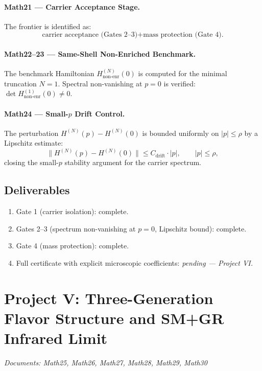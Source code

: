 \documentclass[reprint,aps,pre,onecolumn,superscriptaddress,amsmath,amssymb]{revtex4-2}
\begin{document}
\paragraph{Math21 --- Carrier Acceptance Stage.}
The frontier is identified as:
\begin{equation}
  \boxed{
    \text{carrier acceptance (Gates 2--3)} + \text{mass protection (Gate 4).}
  }
  \label{eq:frontier}
\end{equation}

\paragraph{Math22--23 --- Same-Shell Non-Enriched Benchmark.}
The benchmark Hamiltonian $H_{\mathrm{non\text{-}enr}}^{(N)}(0)$ is computed
for the minimal truncation $N=1$. Spectral non-vanishing at $p=0$ is verified:
$\det H_{\mathrm{non\text{-}enr}}^{(1)}(0) \neq 0$.

\paragraph{Math24 --- Small-$p$ Drift Control.}
The perturbation $H^{(N)}(p) - H^{(N)}(0)$ is bounded uniformly on $|p| \leq \rho$
by a Lipschitz estimate:
\begin{equation}
  \bigl\| H^{(N)}(p) - H^{(N)}(0) \bigr\| \leq C_{\mathrm{drift}} \cdot |p|,
  \qquad |p| \leq \rho,
  \label{eq:drift-bound}
\end{equation}
closing the small-$p$ stability argument for the carrier spectrum.

\subsection{Deliverables}
\begin{enumerate}
  \item Gate 1 (carrier isolation): complete.
  \item Gates 2--3 (spectrum non-vanishing at $p=0$, Lipschitz bound): complete.
  \item Gate 4 (mass protection): complete.
  \item Full certificate with explicit microscopic coefficients: \emph{pending --- Project VI.}
\end{enumerate}

\section{Project V: Three-Generation Flavor Structure and SM+GR Infrared Limit}
\label{sec:proj5}
\textit{Documents: Math25, Math26, Math27, Math28, Math29, Math30}
\end{document}

